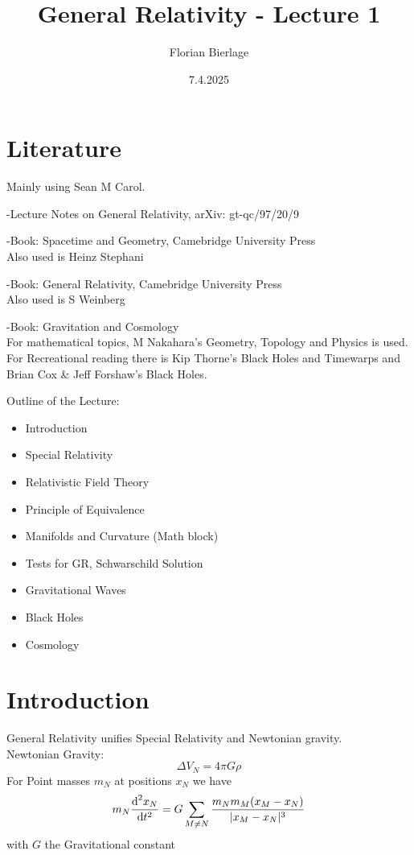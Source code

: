 \documentclass[]{scrartcl}
\title{General Relativity - Lecture 1}
\author{Florian Bierlage}
\date{7.4.2025}
\begin{document}
\maketitle
\newpage
\tableofcontents
\newpage

\section{Literature} 
Mainly using Sean M Carol.

-Lecture Notes on General Relativity, arXiv: gt-qc/97/20/9

-Book: Spacetime and Geometry, Camebridge University Press\\
Also used is Heinz Stephani

-Book: General Relativity, Camebridge University Press\\
Also used is S Weinberg

-Book: Gravitation and Cosmology\\
For mathematical topics, M Nakahara's Geometry, Topology and Physics is used. For Recreational reading there is Kip Thorne's Black Holes and Timewarps and Brian Cox \& Jeff Forshaw's Black Holes.

Outline of the Lecture:
\begin{itemize}
	\item Introduction
	\item Special Relativity
	\item Relativistic Field Theory
	\item Principle of Equivalence
	\item Manifolds and Curvature (Math block)
	\item Tests for GR, Schwarschild Solution
	\item Gravitational Waves
	\item Black Holes
	\item Cosmology
\end{itemize}

\section{Introduction}

General Relativity unifies Special Relativity and Newtonian gravity.\\
Newtonian Gravity:
$$
\Delta V_{N} = 4\pi G\rho
$$
For Point masses $m_N$ at positions $x_N$ we have
$$
m_N \frac{\text d^2 x_N}{\text dt^2} = G\sum_{M\neq N}\frac{m_N m_M (x_M - x_N)}{|x_M-x_N|^3}
$$
with $G$ the Gravitational constant 
\end{document}
